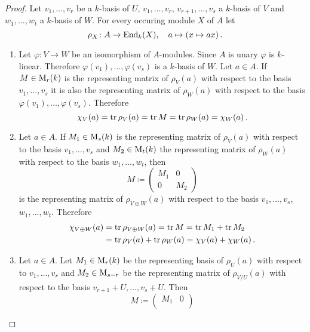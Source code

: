 \begin{proof}
  Let $v_1, \dotsc, v_r$ be a $k$-basis of $U$, $v_1, \dotsc, v_r$, $v_{r+1}, \dotsc, v_s$ a $k$-basis of $V$ and $w_1, \dotsc, w_t$ a $k$-basis of $W$.
  For every occuring module $X$ of $A$ let
  \[
            \rho_X
    \colon  A
    \to     \operatorname{End}_k(X),
    \quad   a
    \mapsto (x \mapsto ax) \,.
  \]
  \begin{enumerate}[label=\emph{\alph*)},leftmargin=*]
    \item
      Let $\varphi \colon V \to W$ be an isomorphism of $A$-modules.
      Since $A$ is unary $\varphi$ is $k$-linear.
      Therefore $\varphi(v_1), \dotsc, \varphi(v_s)$ is a $k$-basis of $W$.
      Let $a \in A$.
      If $M \in \operatorname{M}_r(k)$ is the representing matrix of $\rho_V(a)$ with respect to the basis $v_1, \dotsc, v_s$ it is also the representing matrix of $\rho_W(a)$ with respect to the basis $\varphi(v_1), \dotsc, \varphi(v_s)$.
      Therefore
      \[
          \chi_V(a)
        = \operatorname{tr} \rho_V(a)
        = \operatorname{tr} M
        = \operatorname{tr} \rho_W(a)
        = \chi_W(a) \,.
      \]
    \item
      Let $a \in A$.
      If $M_1 \in \operatorname{M}_s(k)$ is the representing matrix of $\rho_V(a)$ with respect to the basis $v_1, \dotsc, v_s$ and $M_2 \in \operatorname{M}_t(k)$ the representing matrix of $\rho_W(a)$ with respect to the basis $w_1, \dotsc, w_t$, then
      \[
                  M
        \coloneqq \begin{pmatrix}
                    M_1 & 0 \\
                    0 & M_2
                  \end{pmatrix}
      \]
      is the representing matrix of $\rho_{V \oplus W}(a)$ with respect to the basis $v_1, \dotsc, v_s$, $w_1, \dotsc, w_t$.
      Therefore
      \begin{align*}
            \chi_{V \oplus W}(a)
        &=  \operatorname{tr} \rho_{V \oplus W}(a)
         =  \operatorname{tr} M
         =  \operatorname{tr} M_1 + \operatorname{tr} M_2 \\
        &=  \operatorname{tr} \rho_V(a) + \operatorname{tr} \rho_W(a)
         =  \chi_V(a) + \chi_W(a) \,.
      \end{align*}
    \item
      Let $a \in A$.
      Let $M_1 \in \operatorname{M}_r(k)$ be the representing basis of $\rho_U(a)$ with respect to $v_1, \dotsc, v_r$ and $M_2 \in \operatorname{M}_{s-r}$ be the representing matrix of $\rho_{V/U}(a)$ with respect to the basis $v_{r+1} + U, \dotsc, v_s + U$.
      Then
      \[
                  M
        \coloneqq \begin{pmatrix}
                    M_1 & 0 \\

\end{pmatrix}\]
\end{enumerate}
\end{proof}
